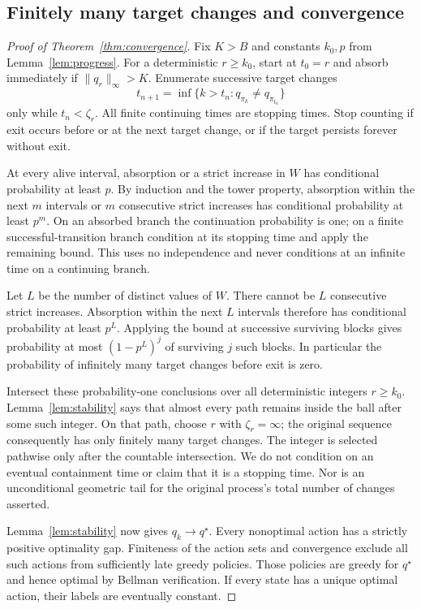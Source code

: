 \subsection{Finitely many target changes and convergence}
\begin{proof}[Proof of Theorem~\ref{thm:convergence}]
Fix $K>B$ and constants $k_0,p$ from Lemma~\ref{lem:progress}. For a deterministic
$r\ge k_0$, start at $t_0=r$ and absorb immediately if $\|q_r\|_\infty>K$. Enumerate successive target
changes
\[
t_{n+1}=\inf\{k>t_n:q_{\pi_k}\ne q_{\pi_{t_n}}\}
\]
only while $t_n<\zeta_r$. All finite continuing times are stopping times. Stop counting if exit
occurs before or at the next target change, or if the target persists forever without exit.

At every alive interval, absorption or a strict increase in $W$ has conditional probability
at least $p$. By induction and the tower property, absorption within the next $m$ intervals
or $m$ consecutive strict increases has conditional probability at least $p^m$. On an absorbed
branch the continuation probability is one; on a finite successful-transition branch condition
at its stopping time and apply the remaining bound. This uses no independence and never
conditions at an infinite time on a continuing branch.

Let $L$ be the number of distinct values of $W$. There cannot be $L$ consecutive strict
increases. Absorption within the next $L$ intervals therefore has conditional probability at least
$p^L$. Applying the bound at successive surviving blocks gives probability at most $(1-p^L)^j$
of surviving $j$ such blocks. In particular the probability of infinitely many target changes
before exit is zero.

Intersect these probability-one conclusions over all deterministic integers $r\ge k_0$. Lemma~\ref{lem:stability}
says that almost every path remains inside the ball after some such integer. On that path,
choose $r$ with $\zeta_r=\infty$; the original sequence consequently has only finitely many target
changes. The integer is selected pathwise only after the countable intersection. We do not
condition on an eventual containment time or claim that it is a stopping time. Nor is an
unconditional geometric tail for the original process's total number of changes asserted.

Lemma~\ref{lem:stability} now gives $q_k\to q^\star$. Every nonoptimal action has a strictly positive optimality
gap. Finiteness of the action sets and convergence exclude all such actions from sufficiently
late greedy policies. Those policies are greedy for $q^\star$ and hence optimal by Bellman verification.
If every state has a unique optimal action, their labels are eventually constant.
\end{proof}
